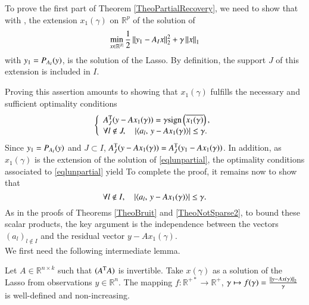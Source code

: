 To prove the first part of Theorem \ref{TheoPartialRecovery}, we need to show that with \wop, the extension  $x_1(\gamma)$ on $\mathbb{R}^p$ of the solution of 
\begin{equation}\label{eqlunpartial}
\min_{x\in\mathbb{R}^{|I|}}\frac{1}{2}\left\Vert{y_1-A_Ix}\right\Vert_{2}^2+\gamma\left\Vert{x}\right\Vert_{1}
\end{equation}
with $y_1=P_{A_I}(y)$, is the solution of the Lasso. By definition, the support $J$ of this extension is included in $I$.

Proving this assertion amounts to showing that $x_1(\gamma)$ fulfills the necessary and sufficient optimality conditions
\begin{equation}\label{l1condF3}
	\left\{ \begin{array}{l} 
		A_J^\mathrm{T}(y-Ax_1(\gamma))=\gamma\mathrm{sign}\left(\overline{x_1(\gamma)}\right), \\
		\forall l\notin J, \quad |\langle a_l,\,y-Ax_1(\gamma)\rangle| \leq \gamma.
	 \end{array} \right.
\end{equation}   
Since $y_1=P_{A_I}(y)$ and $J \subset I$, 
$A_J^\mathrm{T}(y-Ax_1(\gamma))=A_J^\mathrm{T}(y_1-Ax_1(\gamma))$. In addition, as $x_1(\gamma)$ is the extension of the solution of \eqref{eqlunpartial}, the optimality conditions associated to \eqref{eqlunpartial} yield
To complete the proof, it remains now to show that \wop
\begin{equation}\label{eqobj}
	\forall l\notin I, \quad
        |\langle a_l,\,y-Ax_1(\gamma)\rangle| \leq \gamma.
\end{equation}
As in the proofs of Theorems \ref{TheoBruit} and \ref{TheoNotSparse2}, to bound these scalar products, the key argument is the independence between the vectors $(a_l)_{l\notin I}$ and the residual vector $y-Ax_1(\gamma)$.
{~}\\

We first need the following intermediate lemma.
\begin{lemme}\label{lemmedecroissance}
Let $A\in\mathbb{R}^{n\times k}$ such that $(A^\mathrm{T}A)$ is invertible. Take $x(\gamma)$ as a solution of the Lasso from observations $y\in \mathbb{R}^n$. The mapping $f: \mathbb{R}^{+*} \to \mathbb{R}^+$, $\gamma \mapsto f(\gamma)=\frac{\left\Vert{y-Ax(\gamma)}\right\Vert_{2}}{\gamma}$ is well-defined and non-increasing.  
\end{lemme}

